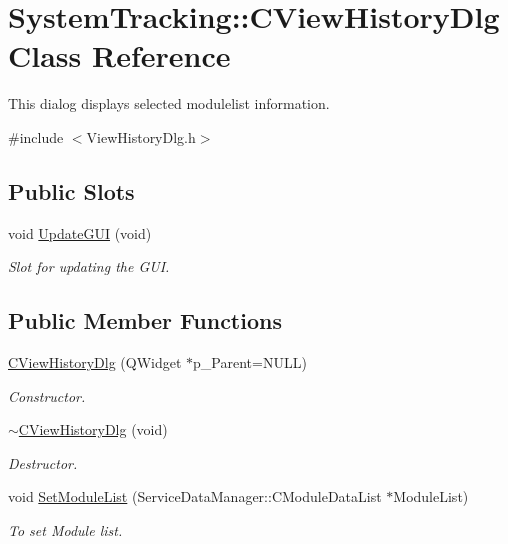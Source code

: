 \hypertarget{classSystemTracking_1_1CViewHistoryDlg}{\section{\-System\-Tracking\-:\-:\-C\-View\-History\-Dlg \-Class \-Reference}
\label{classSystemTracking_1_1CViewHistoryDlg}
}


\-This dialog displays selected modulelist information.  




{\ttfamily \#include $<$\-View\-History\-Dlg.\-h$>$}

\subsection*{\-Public \-Slots}
\begin{DoxyCompactItemize}
\item 
void \hyperlink{classSystemTracking_1_1CViewHistoryDlg_a17a9682e98bdb2b9fa2609bc772e13c4}{\-Update\-G\-U\-I} (void)
\begin{DoxyCompactList}\small\item\em \-Slot for updating the \-G\-U\-I. \end{DoxyCompactList}\end{DoxyCompactItemize}
\subsection*{\-Public \-Member \-Functions}
\begin{DoxyCompactItemize}
\item 
\hyperlink{classSystemTracking_1_1CViewHistoryDlg_a5ecd13e38c8e46338d5ae872e1514eca}{\-C\-View\-History\-Dlg} (\-Q\-Widget $\ast$p\-\_\-\-Parent=\-N\-U\-L\-L)
\begin{DoxyCompactList}\small\item\em \-Constructor. \end{DoxyCompactList}\item 
\hyperlink{classSystemTracking_1_1CViewHistoryDlg_ad194d8ef922f893a870d0ea00271ffe5}{$\sim$\-C\-View\-History\-Dlg} (void)
\begin{DoxyCompactList}\small\item\em \-Destructor. \end{DoxyCompactList}\item 
void \hyperlink{classSystemTracking_1_1CViewHistoryDlg_a4bf8a254f187493285c3a9eb98840b9d}{\-Set\-Module\-List} (\-Service\-Data\-Manager\-::\-C\-Module\-Data\-List $\ast$\-Module\-List)
\begin{DoxyCompactList}\small\item\em \-To set \-Module list. \end{DoxyCompactList}\end{DoxyCompactItemize}


